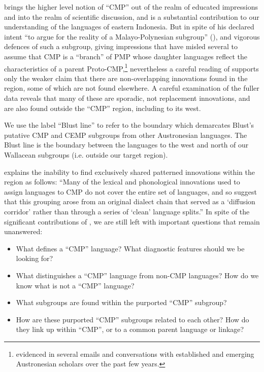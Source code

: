 \citet{Blust1993} brings the higher level notion of “CMP”
out of the realm of educated impressions
and into the realm of scientific discussion,
and is a substantial contribution to our understanding
of the  languages of eastern Indonesia.
But in spite of his declared intent
“to argue for the reality of a  Malayo-Polynesian subgroup”
(\citeyear[244]{Blust1993}),
and vigorous defences of such a subgroup,
giving impressions that have misled several to assume that CMP
is a “branch” of PMP whose daughter languages reflect
the characteristics of a parent Proto-CMP,\footnote{
		 evidenced in several emails
		and conversations with established
		and emerging Austronesian scholars over the past few years.}
nevertheless a careful reading of \citet{Blust1993} supports only
the weaker claim that there are non-overlapping innovations found in the region,
some of which are not found elsewhere.
A careful examination of the fuller data reveals that many of these are sporadic,
not replacement innovations,
and are also found outside the “CMP” region,
including to its west.

We use the label “Blust line”
to refer to the boundary which demarcates Blust's
putative CMP and CEMP subgroups
from other Austronesian languages.
The Blust line is the boundary
between the languages to the west
and north of our Wallacean subgroups (i.e.
outside our target region).

\citet[32]{Blust2013} explains the inability to find exclusively
shared patterned innovations within the region as follows: “Many of the lexical
and phonological innovations used to assign languages
to CMP do not cover the entire set of languages,
and so suggest that this grouping arose from an original dialect chain
that served as a ‘diffusion corridor’ rather than through a series of ‘clean’ language splits.”
In spite of the significant contributions of
\citet{Blust1993,Blust2008,Blust2009,Blust2012b,Blust2013},
we are still left with important questions that remain unanswered:

\begin{itemize}
	\item[1.] What defines a “CMP” language? What diagnostic features should we be looking for?
	\item[2.] What distinguishes a “CMP” language from non-CMP languages?
						How do we know what is not a “CMP” language?
	\item[3.] What subgroups are found within the purported “CMP” subgroup?
	\item[4.] How are these purported “CMP” subgroups related to each other?
						How do they link up within “CMP”, or to a common parent language or linkage?
\end{itemize}

